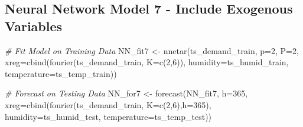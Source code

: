 \documentclass[
]{article}
\newenvironment{Shaded}{\begin{snugshade}}{\end{snugshade}}
\newcommand{\AttributeTok}[1]{\textcolor[rgb]{0.77,0.63,0.00}{#1}}
\newcommand{\CommentTok}[1]{\textcolor[rgb]{0.56,0.35,0.01}{\textit{#1}}}
\newcommand{\DecValTok}[1]{\textcolor[rgb]{0.00,0.00,0.81}{#1}}
\newcommand{\FunctionTok}[1]{\textcolor[rgb]{0.00,0.00,0.00}{#1}}
\newcommand{\NormalTok}[1]{#1}
\newcommand{\OtherTok}[1]{\textcolor[rgb]{0.56,0.35,0.01}{#1}}
\newcommand{\SpecialCharTok}[1]{\textcolor[rgb]{0.00,0.00,0.00}{#1}}
\begin{document}
\begin{Shaded}
\end{Shaded}

\hypertarget{neural-network-model-7---include-exogenous-variables}{%
\subsection{Neural Network Model 7 - Include Exogenous
Variables}\label{neural-network-model-7---include-exogenous-variables}}

\begin{Shaded}
\begin{Highlighting}[]
\CommentTok{\# Fit Model on Training Data}
\NormalTok{NN\_fit7 }\OtherTok{\textless{}{-}} \FunctionTok{nnetar}\NormalTok{(ts\_demand\_train,}
                 \AttributeTok{p=}\DecValTok{2}\NormalTok{,}
                 \AttributeTok{P=}\DecValTok{2}\NormalTok{,}
                 \AttributeTok{xreg=}\FunctionTok{cbind}\NormalTok{(}\FunctionTok{fourier}\NormalTok{(ts\_demand\_train, }
                                          \AttributeTok{K=}\FunctionTok{c}\NormalTok{(}\DecValTok{2}\NormalTok{,}\DecValTok{6}\NormalTok{)),}
                            \AttributeTok{humidity=}\NormalTok{ts\_humid\_train,}
                            \AttributeTok{temperature=}\NormalTok{ts\_temp\_train))}

\CommentTok{\# Forecast on Testing Data}
\NormalTok{NN\_for7 }\OtherTok{\textless{}{-}} \FunctionTok{forecast}\NormalTok{(NN\_fit7, }
                   \AttributeTok{h=}\DecValTok{365}\NormalTok{,}
                   \AttributeTok{xreg=}\FunctionTok{cbind}\NormalTok{(}\FunctionTok{fourier}\NormalTok{(ts\_demand\_train, }
                                          \AttributeTok{K=}\FunctionTok{c}\NormalTok{(}\DecValTok{2}\NormalTok{,}\DecValTok{6}\NormalTok{),}\AttributeTok{h=}\DecValTok{365}\NormalTok{),}
                                \AttributeTok{humidity=}\NormalTok{ts\_humid\_test,}
                                \AttributeTok{temperature=}\NormalTok{ts\_temp\_test))}
\end{Highlighting}
\end{Shaded}
\end{document}
